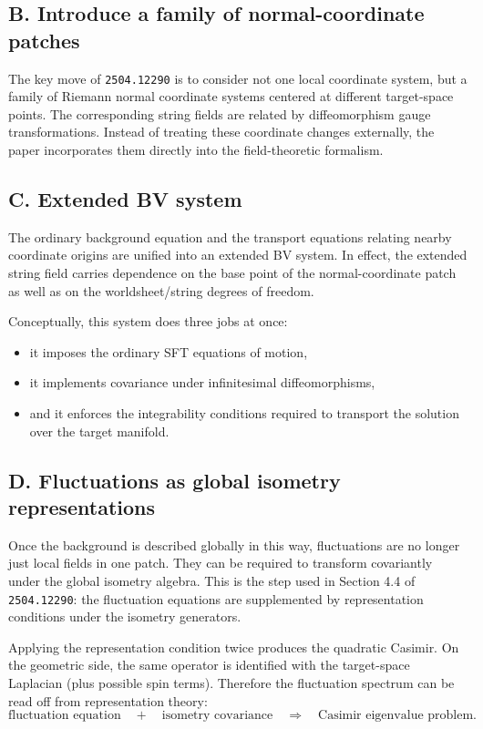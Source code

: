 \documentclass[12pt]{article}
\begin{document}
\subsection*{B. Introduce a family of normal-coordinate patches}

The key move of \texttt{2504.12290} is to consider not one local coordinate system, but a family of
Riemann normal coordinate systems centered at different target-space points.  The corresponding string
fields are related by diffeomorphism gauge transformations.  Instead of treating these coordinate changes
externally, the paper incorporates them directly into the field-theoretic formalism.

\subsection*{C. Extended BV system}

The ordinary background equation and the transport equations relating nearby coordinate origins are unified
into an extended BV system.  In effect, the extended string field carries dependence on the base point of
the normal-coordinate patch as well as on the worldsheet/string degrees of freedom.

Conceptually, this system does three jobs at once:
\begin{itemize}
\item it imposes the ordinary SFT equations of motion,
\item it implements covariance under infinitesimal diffeomorphisms,
\item and it enforces the integrability conditions required to transport the solution over the target
      manifold.
\end{itemize}

\subsection*{D. Fluctuations as global isometry representations}

Once the background is described globally in this way, fluctuations are no longer just local fields in one
patch.  They can be required to transform covariantly under the global isometry algebra.  This is the step
used in Section 4.4 of \texttt{2504.12290}: the fluctuation equations are supplemented by representation
conditions under the isometry generators.

Applying the representation condition twice produces the quadratic Casimir.  On the geometric side, the
same operator is identified with the target-space Laplacian (plus possible spin terms).  Therefore the
fluctuation spectrum can be read off from representation theory:
\begin{equation}
\text{fluctuation equation}
\quad + \quad
\text{isometry covariance}
\quad \Longrightarrow \quad
\text{Casimir eigenvalue problem}.
\end{equation}
\end{document}
